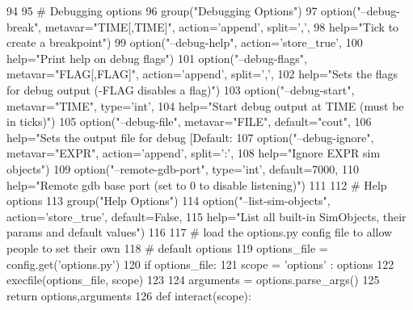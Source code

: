 \begin{DoxyCode}
94 
95     # Debugging options
96     group("Debugging Options")
97     option("--debug-break", metavar="TIME[,TIME]", action='append', split=',',
98         help="Tick to create a breakpoint")
99     option("--debug-help", action='store_true',
100         help="Print help on debug flags")
101     option("--debug-flags", metavar="FLAG[,FLAG]", action='append', split=',',
102         help="Sets the flags for debug output (-FLAG disables a flag)")
103     option("--debug-start", metavar="TIME", type='int',
104         help="Start debug output at TIME (must be in ticks)")
105     option("--debug-file", metavar="FILE", default="cout",
106         help="Sets the output file for debug [Default: %
107     option("--debug-ignore", metavar="EXPR", action='append', split=':',
108         help="Ignore EXPR sim objects")
109     option("--remote-gdb-port", type='int', default=7000,
110         help="Remote gdb base port (set to 0 to disable listening)")
111 
112     # Help options
113     group("Help Options")
114     option("--list-sim-objects", action='store_true', default=False,
115         help="List all built-in SimObjects, their params and default values")
116 
117     # load the options.py config file to allow people to set their own
118     # default options
119     options_file = config.get('options.py')
120     if options_file:
121         scope = { 'options' : options }
122         execfile(options_file, scope)
123 
124     arguments = options.parse_args()
125     return options,arguments
126 
def interact(scope):
\end{DoxyCode}


